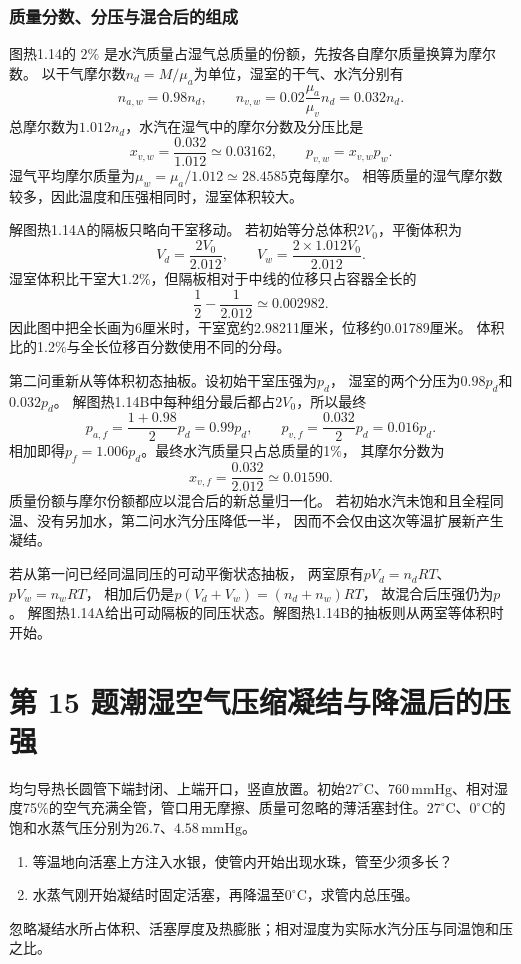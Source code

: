 \documentclass[UTF8,fontset=fandol,a4paper,11pt]{ctexart}
\begin{document}
\subsubsection*{质量分数、分压与混合后的组成}
图热1.14的 $2\%$ 是水汽质量占湿气总质量的份额，先按各自摩尔质量换算为摩尔数。
以干气摩尔数$n_d=M/\mu_a$为单位，湿室的干气、水汽分别有
\[
n_{a,w}=0.98n_d,\qquad
n_{v,w}=0.02\frac{\mu_a}{\mu_v}n_d=0.032n_d.
\]
总摩尔数为$1.012n_d$，水汽在湿气中的摩尔分数及分压比是
\[
x_{v,w}=\frac{0.032}{1.012}\simeq0.03162,
\qquad p_{v,w}=x_{v,w}p_w.
\]
湿气平均摩尔质量为$\mu_w=\mu_a/1.012\simeq28.4585$克每摩尔。
相等质量的湿气摩尔数较多，因此温度和压强相同时，湿室体积较大。

解图热1.14A的隔板只略向干室移动。
若初始等分总体积$2V_0$，平衡体积为
\[
V_d=\frac{2V_0}{2.012},\qquad
V_w=\frac{2\times1.012V_0}{2.012}.
\]
湿室体积比干室大1.2\%，但隔板相对于中线的位移只占容器全长的
\[
\frac12-\frac1{2.012}\simeq0.002982.
\]
因此图中把全长画为6厘米时，干室宽约2.98211厘米，位移约0.01789厘米。
体积比的1.2\%与全长位移百分数使用不同的分母。

第二问重新从等体积初态抽板。设初始干室压强为$p_d$，
湿室的两个分压为$0.98p_d$和$0.032p_d$。
解图热1.14B中每种组分最后都占$2V_0$，所以最终
\[
p_{a,f}=\frac{1+0.98}{2}p_d=0.99p_d,\qquad
p_{v,f}=\frac{0.032}{2}p_d=0.016p_d.
\]
相加即得$p_f=1.006p_d$。最终水汽质量只占总质量的1\%，
其摩尔分数为
\[
x_{v,f}=\frac{0.032}{2.012}\simeq0.01590.
\]
质量份额与摩尔份额都应以混合后的新总量归一化。
若初始水汽未饱和且全程同温、没有另加水，第二问水汽分压降低一半，
因而不会仅由这次等温扩展新产生凝结。

若从第一问已经同温同压的可动平衡状态抽板，
两室原有$pV_d=n_dRT$、$pV_w=n_wRT$，
相加后仍是$p(V_d+V_w)=(n_d+n_w)RT$，
故混合后压强仍为$p$。
解图热1.14A给出可动隔板的同压状态。解图热1.14B的抽板则从两室等体积时开始。




\section*{第 15 题\quad 潮湿空气压缩凝结与降温后的压强}

均匀导热长圆管下端封闭、上端开口，竖直放置。初始$27^\circ\mathrm C$、$760\,\mathrm{mmHg}$、相对湿度75\%的空气充满全管，管口用无摩擦、质量可忽略的薄活塞封住。$27^\circ\mathrm C$、$0^\circ\mathrm C$的饱和水蒸气压分别为$26.7$、$4.58\,\mathrm{mmHg}$。
\begin{enumerate}
\item 等温地向活塞上方注入水银，使管内开始出现水珠，管至少须多长？
\item 水蒸气刚开始凝结时固定活塞，再降温至$0^\circ\mathrm C$，求管内总压强。
\end{enumerate}
忽略凝结水所占体积、活塞厚度及热膨胀；相对湿度为实际水汽分压与同温饱和压之比。
\end{document}
